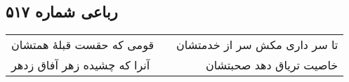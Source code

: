 \begin{center}
\section*{رباعی شماره ۵۱۷}
\label{sec:sh517}
\begin{longtable}{l p{0.5cm} r}
قومی که حقست قبلهٔ همتشان
&&
تا سر داری مکش سر از خدمتشان
\\
آنرا که چشیده زهر آفاق زدهر
&&
خاصیت تریاق دهد صحبتشان
\\
\end{longtable}
\end{center}
